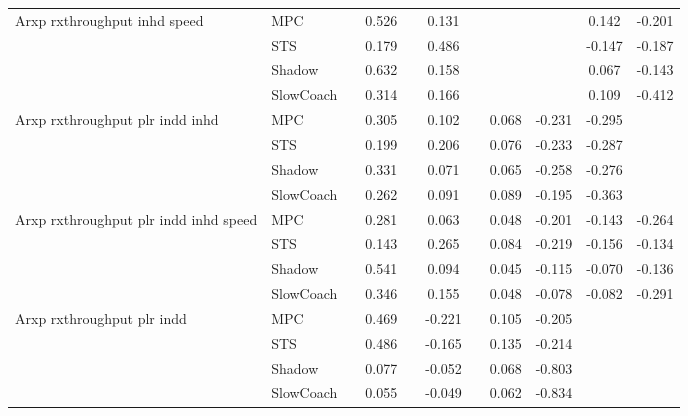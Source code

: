 \begin{tabular}{|l|l|*{9}{c|}}
\midrule
Arxp rxthroughput inhd speed    & MPC &       &     0.526 &        &  0.131 &     &     &      &   0.142 &   -0.201 \\
                              & STS &       &     0.179 &        &  0.486 &     &     &      &  -0.147 &   -0.187 \\
                              & Shadow &       &     0.632 &        &  0.158 &     &     &      &   0.067 &   -0.143 \\
                              & SlowCoach &       &     0.314 &        &  0.166 &     &     &      &   0.109 &   -0.412 \\
\midrule
Arxp rxthroughput plr indd inhd    & MPC &       &     0.305 &        &  0.102 &     &  0.068 &  -0.231 &  -0.295 &       \\
                              & STS &       &     0.199 &        &  0.206 &     &  0.076 &  -0.233 &  -0.287 &       \\
                              & Shadow &       &     0.331 &        &  0.071 &     &  0.065 &  -0.258 &  -0.276 &       \\
                              & SlowCoach &       &     0.262 &        &  0.091 &     &  0.089 &  -0.195 &  -0.363 &       \\
\midrule
Arxp rxthroughput plr indd inhd speed    & MPC &       &     0.281 &        &  0.063 &     &  0.048 &  -0.201 &  -0.143 &   -0.264 \\
                              & STS &       &     0.143 &        &  0.265 &     &  0.084 &  -0.219 &  -0.156 &   -0.134 \\
                              & Shadow &       &     0.541 &        &  0.094 &     &  0.045 &  -0.115 &  -0.070 &   -0.136 \\
                              & SlowCoach &       &     0.346 &        &  0.155 &     &  0.048 &  -0.078 &  -0.082 &   -0.291 \\
\midrule
Arxp rxthroughput plr indd    & MPC &       &     0.469 &        & -0.221 &     &  0.105 &  -0.205 &      &       \\
                              & STS &       &     0.486 &        & -0.165 &     &  0.135 &  -0.214 &      &       \\
                              & Shadow &       &     0.077 &        & -0.052 &     &  0.068 &  -0.803 &      &       \\
                              & SlowCoach &       &     0.055 &        & -0.049 &     &  0.062 &  -0.834 &      &       \\

\end{tabular}
